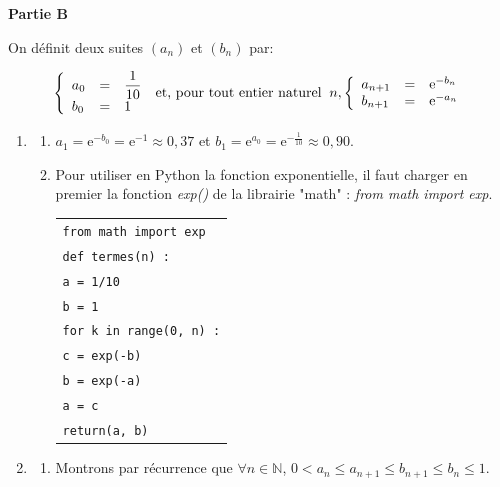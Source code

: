 \documentclass[10pt]{article}
\providecommand{\N}{\mathbb{N}}
\providecommand{\e}{{\mathrm{e}}}
\begin{document}
\medskip

\textbf{Partie B}

\medskip

On définit deux suites $\left(a_n\right)$ et $\left(b_n\right)$ par:

\[\left\{\begin{array}{l c l}
	a_0& =& \dfrac{1}{10}\\
	b_0& =& 1
\end{array}\right.\: \text{et, pour tout entier naturel }\: n,\left\{\begin{array}{l c l}
	a_{n+1}&=&\text{e}^{-b_n}\\
	b_{n+1}&=&\text{e}^{-a_n}
\end{array}\right.\]

\begin{enumerate}
	\item 
	\begin{enumerate}
		\item $a_1=\e^{-b_0}=\e^{-1}\approx 0,37$ \quad et \quad $b_1=\e^{a_0}=\e^{-\frac{1}{10}}\approx 0,90$.
		\item Pour utiliser en Python la fonction exponentielle, il faut charger en premier la fonction \textit{exp()} de la librairie "math" : \textit{from math import exp}. 
		
		\begin{center}
			
			\begin{tabular}{|l|}\hline
				\texttt{from math import exp}\\
				\texttt{def termes(n) :}\\
				\quad \texttt{a = 1/10}\\
				\quad \texttt{b = 1}\\
				\quad \texttt{for k in range(0, n) :}\\
				\qquad \texttt{c =  exp(-b)}\\
				\qquad \texttt{b  = exp(-a)}\\
				\qquad \texttt{a  =  c}\\
				\quad \texttt{return(a, b)}\\ \hline
			\end{tabular}
		\end{center}
	\end{enumerate}
\item  

\begin{enumerate}
	\item Montrons par récurrence que $\forall n \in \N$, $0 < a_n \leqslant a_{n+1} \leqslant b_{n+1} \leqslant b_n \leqslant 1$.


\end{enumerate}
\end{enumerate}
\end{document}
